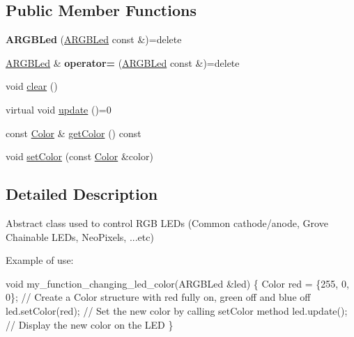 \subsection*{Public Member Functions}
\begin{DoxyCompactItemize}
\item 
\mbox{\label{classwood_box_1_1display_1_1_a_r_g_b_led_a9d09c3d236e0ff522f1c4057aee6e3a9}} 
{\bfseries A\+R\+G\+B\+Led} (\mbox{\hyperlink{classwood_box_1_1display_1_1_a_r_g_b_led}{A\+R\+G\+B\+Led}} const \&)=delete
\item 
\mbox{\label{classwood_box_1_1display_1_1_a_r_g_b_led_acbc8bea5a3b1fe292d3ac37ab647d21b}} 
\mbox{\hyperlink{classwood_box_1_1display_1_1_a_r_g_b_led}{A\+R\+G\+B\+Led}} \& {\bfseries operator=} (\mbox{\hyperlink{classwood_box_1_1display_1_1_a_r_g_b_led}{A\+R\+G\+B\+Led}} const \&)=delete
\item 
void \mbox{\hyperlink{classwood_box_1_1display_1_1_a_r_g_b_led_a6639eef02bb6b70988d85c006f73eb72}{clear}} ()
\item 
virtual void \mbox{\hyperlink{classwood_box_1_1display_1_1_a_r_g_b_led_ab71f321d91e931f95b96d1f492a9454d}{update}} ()=0
\item 
const \mbox{\hyperlink{structwood_box_1_1display_1_1_a_r_g_b_led_1_1_color}{Color}} \& \mbox{\hyperlink{classwood_box_1_1display_1_1_a_r_g_b_led_ae0bd01eab303006612eb46058824b0c1}{get\+Color}} () const
\item 
void \mbox{\hyperlink{classwood_box_1_1display_1_1_a_r_g_b_led_ac06b3ee90d2f49785173e9142df47bb7}{set\+Color}} (const \mbox{\hyperlink{structwood_box_1_1display_1_1_a_r_g_b_led_1_1_color}{Color}} \&color)
\end{DoxyCompactItemize}


\subsection{Detailed Description}
Abstract class used to control R\+GB L\+E\+Ds (Common cathode/anode, Grove Chainable L\+E\+Ds, Neo\+Pixels, ...etc)

Example of use\+:


\begin{DoxyCode}
\textcolor{keywordtype}{void} my\_function\_changing\_led\_color(ARGBLed &led) \{
  Color red = \{255, 0, 0\}; \textcolor{comment}{// Create a Color structure with red fully on, green off and blue off}
  led.setColor(red); \textcolor{comment}{// Set the new color by calling setColor method}
  led.update(); \textcolor{comment}{// Display the new color on the LED}
\}
\end{DoxyCode}
 

